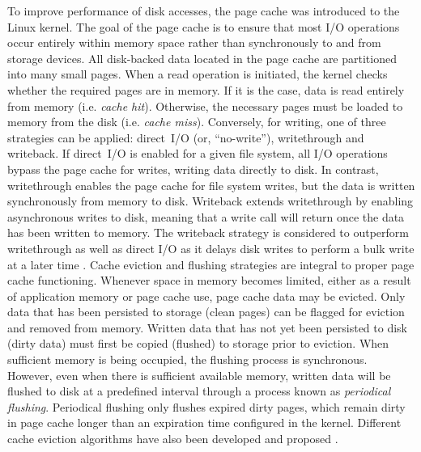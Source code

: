 \documentclass[conference]{IEEEtran}
\begin{document}
        To improve performance of disk accesses, the page cache was introduced to the Linux kernel. %
        The goal of the page cache is to ensure that most I/O operations occur entirely
        within memory space rather than synchronously to and from storage devices.
        All disk-backed data located in the page cache are partitioned into many small pages.
        When a read operation is initiated, the kernel checks whether the required pages are in memory.
        If it is the case, data is read entirely from memory (i.e. \textit{cache hit}). Otherwise,
        the necessary pages must be loaded to memory from the disk (i.e. \textit{cache miss}).
        Conversely, for writing, one of three strategies can be applied: direct~I/O (or, ``no-write''),
        writethrough and writeback.
        If direct~I/O is enabled for a given file system, all I/O operations bypass the
        page cache for writes, writing data directly to disk. In contrast, writethrough enables the page cache
        for file system writes, but the data is written synchronously from memory to disk. Writeback extends writethrough
        by enabling asynchronous writes to disk, meaning that a write call will return once
        the data has been written to memory.
        The writeback strategy is considered to outperform writethrough as well as
        direct I/O as it delays disk writes to perform a bulk write at a later time
        \cite{linuxdev3rd2010}.
        Cache eviction and flushing strategies are integral to proper page cache functioning.
        Whenever space in memory becomes limited, either as a result of application memory
        or page cache use, page cache data may be evicted. Only data that
        has been persisted to storage (clean pages) can be flagged for eviction and removed from
        memory. Written data that has not yet been persisted to disk (dirty data) must first
        be copied (flushed) to storage prior to eviction. When sufficient memory is
        being occupied, the flushing process is synchronous. However, even when
        there is sufficient available memory, written data will be flushed to disk
        at a predefined interval through a process known as \textit{periodical flushing}.
        Periodical flushing only flushes expired dirty pages, which remain dirty in
        page cache longer than an expiration time configured in the kernel.
        Different cache eviction algorithms have also been developed and proposed
        \cite{owda2014comparison}.
\end{document}
